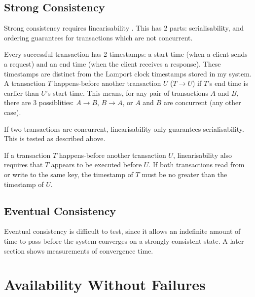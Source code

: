 \documentclass[12pt,a4paper,twoside,openany]{report}
\begin{document}
\subsection{Strong Consistency}

Strong consistency requires linearisability \cite{herlihy1990linearizability}. This has 2 parts: serialisability, and ordering guarantees for transactions which are not concurrent.

Every successful transaction has 2 timestamps: a start time (when a client sends a request) and an end time (when the client receives a response). These timestamps are distinct from the Lamport clock timestamps stored in my system. A transaction $T$ happens-before another transaction $U$ ($T \rightarrow U$) if $T$'s end time is earlier than $U$'s start time. This means, for any pair of transactions $A$ and $B$, there are 3 possiblities: $A \rightarrow B$, $B \rightarrow A$, or $A$ and $B$ are concurrent (any other case).

If two transactions are concurrent, linearisability only guarantees serialisability. This is tested as described above.

If a transaction $T$ happens-before another transaction $U$, linearisability also requires that $T$ appears to be executed before $U$. If both transactions read from or write to the same key, the timestamp of $T$ must be no greater than the timestamp of $U$.

\subsection{Eventual Consistency}

Eventual consistency is difficult to test, since it allows an indefinite amount of time to pass before the system converges on a strongly consistent state. A later section shows measurements of convergence time.

\section{Availability Without Failures}
\end{document}
